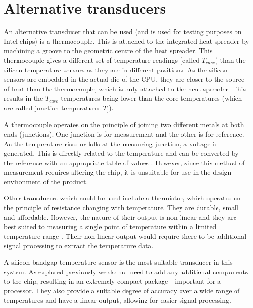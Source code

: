 \documentclass[conference]{IEEEtran}
\begin{document}
\section{Alternative transducers}
An alternative transducer that can be used (and is used for testing purposes on Intel chips) is a thermocouple. This is attached to the integrated heat spreader by machining a groove to the geometric centre of the heat spreader. This thermocouple gives a different set of temperature readings (called $T_{case}$) than the silicon temperature sensors as they are in different positions. As the silicon sensors are embedded in the actual die of the CPU, they are closer to the source of heat than the thermocouple, which is only attached to the heat spreader. This results in the $T_{case}$ temperatures being lower than the core temperatures (which are called junction temperatures $T_{j}$).

A thermocouple operates on the principle of joining two different metals at both ends (junctions). One junction is for measurement and the other is for reference. As the temperature rises or falls at the measuring junction, a voltage is generated. This is directly related to the temperature and can be converted by the reference with an appropriate table of values \cite{b5}. However, since this method of measurement requires altering the chip, it is unsuitable for use in the design environment of the product.

Other transducers which could be used include a thermistor, which operates on the principle of resistance changing with temperature. They are durable, small and affordable. However, the nature of their output is non-linear and they are best suited to measuring a single point of temperature within a limited temperature range \cite{b6}. Their non-linear output would require there to be additional signal processing to extract the temperature data. 

A silicon bandgap temperature sensor is the most suitable transducer in this system. As explored previously we do not need to add any additional components to the chip, resulting in an extremely compact package - important for a processor. They also provide a suitable degree of accuracy over a wide range of temperatures and have a linear output, allowing for easier signal processing. 
\end{document}
